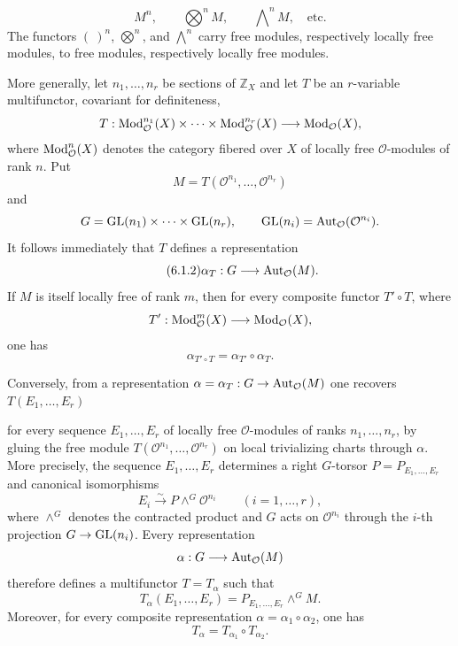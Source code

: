 \begin{equation}\tag{6.1.1}
M^n,\qquad \bigotimes\nolimits^n M,\qquad
\bigwedge\nolimits^n M,\quad\text{etc.}
\end{equation}
The functors $(\ )^n$, $\bigotimes^n$, and $\bigwedge^n$ carry free modules,
respectively locally free modules, to free modules, respectively locally free
modules.

More generally, let $n_1,\ldots,n_r$ be sections of $\mathbb Z_X$ and let
$T$ be an $r$-variable multifunctor, covariant for definiteness,
\[
T:\operatorname{Mod}_{\mathcal O}^{n_1}(X)\times\cdots\times
\operatorname{Mod}_{\mathcal O}^{n_r}(X)\longrightarrow\operatorname{Mod}_{\mathcal O}(X),
\]
where $\operatorname{Mod}_{\mathcal O}^n(X)$ denotes the category fibered over $X$ of
locally free $\mathcal O$-modules of rank $n$. Put
\[
M=T(\mathcal O^{n_1},\ldots,\mathcal O^{n_r})
\]
and
\[
G=\operatorname{GL}(n_1)\times\cdots\times\operatorname{GL}(n_r),
\qquad
\operatorname{GL}(n_i)=\operatorname{Aut}_{\mathcal O}(\mathcal O^{n_i}).
\]
It follows immediately that $T$ defines a representation
\begin{equation}\tag{6.1.2}
\alpha_T:G\longrightarrow\operatorname{Aut}_{\mathcal O}(M).
\end{equation}
If $M$ is itself locally free of rank $m$, then for every composite functor
$T'\circ T$, where
\[
T':\operatorname{Mod}_{\mathcal O}^m(X)\longrightarrow\operatorname{Mod}_{\mathcal O}(X),
\]
one has
\begin{equation}\tag{6.1.3}
\alpha_{T'\circ T}=\alpha_{T'}\circ\alpha_T.
\end{equation}

Conversely, from a representation
$\alpha=\alpha_T:G\to\operatorname{Aut}_{\mathcal O}(M)$ one recovers
$T(E_1,\ldots,E_r)$

for every sequence $E_1,\ldots,E_r$ of locally free $\mathcal O$-modules of
ranks $n_1,\ldots,n_r$, by gluing the free module
$T(\mathcal O^{n_1},\ldots,\mathcal O^{n_r})$ on local trivializing charts
through $\alpha$. More precisely, the sequence $E_1,\ldots,E_r$ determines a
right $G$-torsor $P=P_{E_1,\ldots,E_r}$ and canonical isomorphisms
\begin{equation}\tag{6.1.3}
E_i\xrightarrow{\sim}P\mathbin{\wedge^G}\mathcal O^{n_i}
\qquad(i=1,\ldots,r),
\end{equation}
where $\wedge^G$ denotes the contracted product and $G$ acts on
$\mathcal O^{n_i}$ through the $i$-th projection $G\to\operatorname{GL}(n_i)$. Every
representation
\[
\alpha:G\longrightarrow\operatorname{Aut}_{\mathcal O}(M)
\]
therefore defines a multifunctor $T=T_\alpha$ such that
\begin{equation}\tag{6.1.4}
T_\alpha(E_1,\ldots,E_r)
=P_{E_1,\ldots,E_r}\mathbin{\wedge^G}M.
\end{equation}
Moreover, for every composite representation
$\alpha=\alpha_1\circ\alpha_2$, one has
\begin{equation}\tag{6.1.5}
T_\alpha=T_{\alpha_1}\circ T_{\alpha_2}.
\end{equation}

